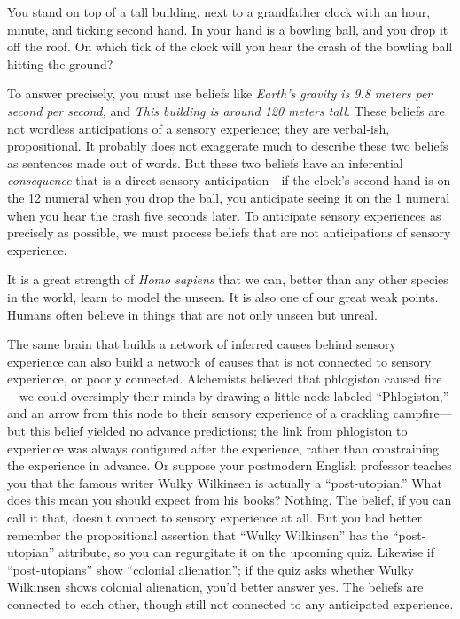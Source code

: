 {
 You stand on top of a tall building, next to a grandfather clock
with an hour, minute, and ticking second hand. In your hand is a
bowling ball, and you drop it off the roof. On which tick of the clock
will you hear the crash of the bowling ball hitting the ground?}

{
 To answer precisely, you must use beliefs like
\textit{Earth's gravity is 9.8 meters per second per
second,} and \textit{This building is around 120 meters tall.} These
beliefs are not wordless anticipations of a sensory experience; they
are verbal-ish, propositional. It probably does not exaggerate much to
describe these two beliefs as sentences made out of words. But these
two beliefs have an inferential \textit{consequence} that is a direct
sensory anticipation---if the clock's second hand is on
the 12 numeral when you drop the ball, you anticipate seeing it on the
1 numeral when you hear the crash five seconds later. To anticipate
sensory experiences as precisely as possible, we must process beliefs
that are not anticipations of sensory experience.}

{
 It is a great strength of \textit{Homo sapiens} that we can,
better than any other species in the world, learn to model the unseen.
It is also one of our great weak points. Humans often believe in things
that are not only unseen but unreal.}

{
 The same brain that builds a network of inferred causes behind
sensory experience can also build a network of causes that is not
connected to sensory experience, or poorly connected. Alchemists
believed that phlogiston caused fire---we could oversimply their minds
by drawing a little node labeled
``Phlogiston,'' and an arrow from
this node to their sensory experience of a crackling campfire---but
this belief yielded no advance predictions; the link from phlogiston to
experience was always configured after the experience, rather than
constraining the experience in advance. Or suppose your postmodern
English professor teaches you that the famous writer Wulky Wilkinsen is
actually a ``post-utopian.'' What
does this mean you should expect from his books? Nothing. The belief,
if you can call it that, doesn't connect to sensory
experience at all. But you had better remember the propositional
assertion that ``Wulky Wilkinsen''
has the ``post-utopian'' attribute,
so you can regurgitate it on the upcoming quiz. Likewise if
``post-utopians'' show
``colonial alienation''; if the quiz
asks whether Wulky Wilkinsen shows colonial alienation,
you'd better answer yes. The beliefs are connected to
each other, though still not connected to any anticipated experience.}

